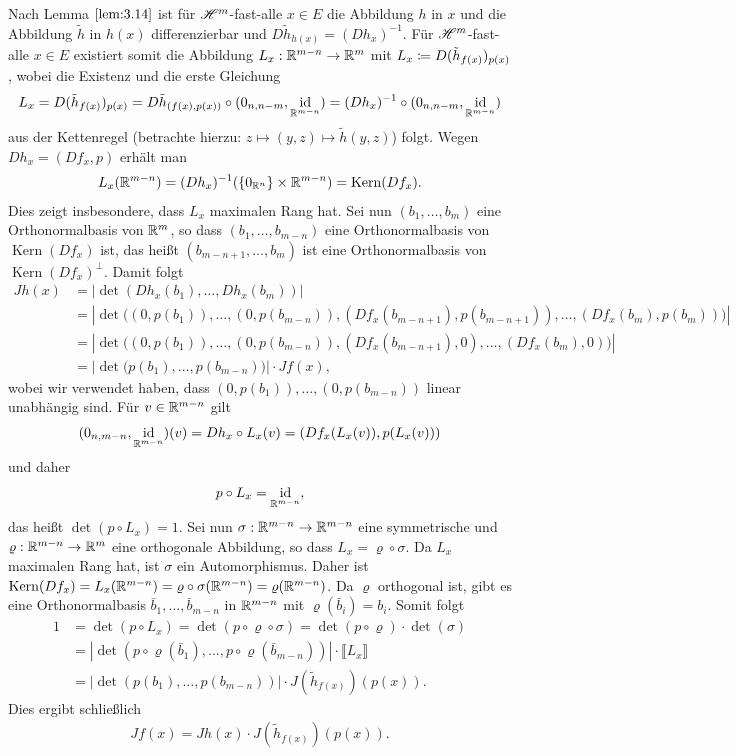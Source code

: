 \documentclass[a4paper,twoside,DIV15,BCOR12mm]{scrbook}
\newcommand{\HM}{\H}
\DeclareMathOperator{\id}{id}
\DeclareMathOperator{\Kern}{Kern}
\begin{document}
\begin{beweis}
Nach Lemma $\ref{lem:3.14}$ ist für $\HM^m$-fast-alle $x\in E$ die Abbildung $h$ in $x$ und die Abbildung $\tilde h$ in $h(x)$ differenzierbar und $D\tilde h_{h(x)} = (Dh_x)^{-1}$. Für $\HM^m$-fast-alle $x\in E$ existiert somit die Abbildung $L_x:\mathbb{R}^{m-n}\to\mathbb{R}^m$ mit $L_x\da D(\tilde h_{f(x)})_{p(x)}$, wobei die Existenz und die erste  Gleichung
$$
L_x= D(\tilde h_{f(x)})_{p(x)} 
= D\tilde h_{(f(x),p(x))} \circ (0_{n,n-m}, \id_{\MdR^{m-n}})=(D h_x)^{-1}\circ (0_{n,n-m}, \id_{\MdR^{m-n}})
$$
aus der Kettenregel  (betrachte hierzu: $z\mapsto (y,z)\mapsto \tilde h(y,z)$) folgt. Wegen 
$Dh_x = (Df_x,p)$ erhält man  
\begin{align*}
L_x(\MdR^{m-n}) = (Dh_x)^{-1}(\{0_{\MdR^n}\} \times \MdR^{m-n}) = \Kern(Df_x).
\end{align*}
Dies zeigt insbesondere, dass $L_x$ maximalen Rang hat. 
Sei nun $(b_1,\ldots,b_m)$ eine Orthonormalbasis von $\mathbb{R}^m$, so dass $(b_1,\ldots,b_{m-n})$ eine Orthonormalbasis von $\Kern(Df_x)$ ist, das heißt $(b_{m-n+1},\ldots,b_m)$ ist eine Orthonormalbasis von $\Kern(Df_x)^\bot$. Damit folgt
\begin{align*}
Jh(x) 
&= |\det(Dh_x(b_1),\ldots,Dh_x(b_m))|\\
&= |\det\big( (0,p(b_1)),\ldots,(0,p(b_{m-n})), (Df_x(b_{m-n+1}),p(b_{m-n+1})),\ldots,(Df_x(b_{m}),p(b_{m}))\big)|\\
&= |\det\big( (0,p(b_1)),\ldots,(0,p(b_{m-n})), (Df_x(b_{m-n+1}),0),\ldots,(Df_x(b_{m}),0)\big)|\\
&= |\det\big( p(b_1),\ldots,p(b_{m-n})\big)| \cdot Jf(x) ,
\end{align*}
wobei wir verwendet haben, dass $(0,p(b_1)),\ldots,(0,p(b_{m-n}))$ linear unabhängig sind. 
Für $v\in\mathbb{R}^{m-n}$ gilt
\begin{align*}
(0_{n,m-n}, \id_{\MdR^{m-n}})(v) = Dh_x \circ L_x(v) = (Df_x(L_x(v)), p(L_x(v))) 
\end{align*}
und daher
\begin{align*}
p\circ L_x = \id_{\MdR^{m-n}},
\end{align*}
das heißt $\det(p\circ L_x)=1$. Sei nun $\sigma:\mathbb{R}^{m-n} \to \mathbb{R}^{m-n}$ eine symmetrische und $\varrho:\mathbb{R}^{m-n}\to\mathbb{R}^m$ eine orthogonale Abbildung, so dass $L_x=\varrho \circ \sigma$. Da $L_x$ 
maximalen Rang hat, ist $\sigma$ ein Automorphismus. Daher ist $\Kern(Df_x) = L_x(\MdR^{m-n}) = \varrho\circ\sigma(\MdR^{m-n}) = \varrho(\MdR^{m-n})$. Da $\varrho$ orthogonal ist, gibt es eine Orthonormalbasis $\bar b_1,\ldots,\bar b_{m-n}$ in $ \mathbb{R}^{m-n}$ mit $\varrho(\bar b_i) = b_i$. Somit folgt
\begin{align*}
1 &= \det(p\circ L_x) = \det(p\circ\varrho\circ\sigma) = \det(p\circ \varrho) \cdot \det(\sigma) \\
&= |\det( p\circ\varrho(\bar b_1), \ldots, p\circ\varrho(\bar b_{m-n}))| \cdot \llbracket L_x\rrbracket \\
&= |\det( p(b_1), \ldots, p(b_{m-n}))| \cdot J(\tilde h_{f(x)})(p(x)).
\end{align*}
Dies ergibt schließlich
\begin{align*}
Jf(x) = Jh(x) \cdot J(\tilde h_{f(x)}) (p(x)).
\end{align*}


\end{beweis}
\end{document}
